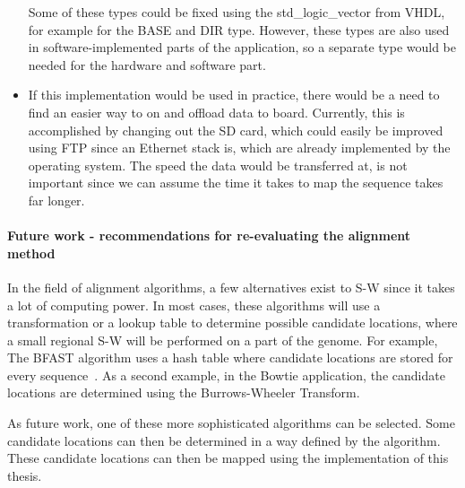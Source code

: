 \begin{itemize}
	
	Some of these types could be fixed using the std\_logic\_vector from VHDL, for example for the BASE and DIR type. However, these types are also used in software-implemented parts of the application, so a separate type would be needed for the hardware and software part.
	
	\item If this implementation would be used in practice, there would be a need to find an easier way to on and offload data to board. Currently,  this is accomplished by changing out the SD card, which could easily be improved using FTP since an Ethernet stack is, which are already implemented by the operating system. The speed the data would be transferred at, is not important since we can assume the time it takes to map the sequence takes far longer. 
	
\end{itemize}

\paragraph{Future work - recommendations for re-evaluating the alignment method}

In the field of alignment algorithms, a few alternatives exist to S-W since it takes a lot of computing power. In most cases, these algorithms will use a transformation or a lookup table to determine possible candidate locations, where a small regional S-W will be performed on a part of the genome. For example, The BFAST algorithm uses a hash table where candidate locations are stored for every sequence~\cite{fpgaImpl}. As a second example, in the Bowtie application, the candidate locations are determined using the Burrows-Wheeler Transform.

As future work, one of these more sophisticated algorithms can be selected. Some candidate locations can then be determined in a way defined by the algorithm. These candidate locations can then be mapped using the implementation of this thesis.